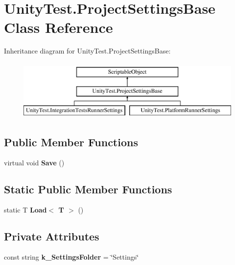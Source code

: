 \hypertarget{class_unity_test_1_1_project_settings_base}{}\section{Unity\+Test.\+Project\+Settings\+Base Class Reference}
\label{class_unity_test_1_1_project_settings_base}
Inheritance diagram for Unity\+Test.\+Project\+Settings\+Base\+:\begin{figure}[H]
\begin{center}
\leavevmode
\includegraphics[height=3.000000cm]{class_unity_test_1_1_project_settings_base}
\end{center}
\end{figure}
\subsection*{Public Member Functions}
\begin{DoxyCompactItemize}
\item 
\mbox{\label{class_unity_test_1_1_project_settings_base_abf6d000a00f7703d14d756ac8086c814}} 
virtual void {\bfseries Save} ()
\end{DoxyCompactItemize}
\subsection*{Static Public Member Functions}
\begin{DoxyCompactItemize}
\item 
\mbox{\label{class_unity_test_1_1_project_settings_base_ad56a379039296f48c00c70e3bd9ebd28}} 
static T {\bfseries Load$<$ T $>$} ()
\end{DoxyCompactItemize}
\subsection*{Private Attributes}
\begin{DoxyCompactItemize}
\item 
\mbox{\label{class_unity_test_1_1_project_settings_base_ac543861f6ed7150d0418c9c315ebcb5f}} 
const string {\bfseries k\+\_\+\+Settings\+Folder} = \char`\"{}Settings\char`\"{}
\end{DoxyCompactItemize}
